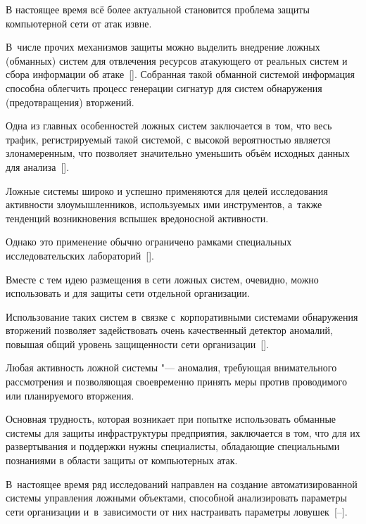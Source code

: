
В настоящее время всё более актуальной становится проблема защиты компьютерной сети от атак извне. 

В~числе прочих механизмов защиты можно выделить внедрение ложных (обманных) систем для отвлечения ресурсов атакующего от реальных систем и сбора информации об атаке~[]. Собранная такой обманной системой информация способна облегчить процесс генерации сигнатур для систем обнаружения (предотвращения) вторжений. 

Одна из главных особенностей ложных систем заключается в~том, что весь трафик, регистрируемый такой системой, с высокой вероятностью является злонамеренным, что позволяет значительно уменьшить объём исходных данных для анализа~[]. 

Ложные системы широко и успешно применяются для целей исследования активности злоумышленников, используемых ими инструментов, а~также тенденций возникновения вспышек вредоносной активности. 

Однако это применение обычно ограничено рамками специальных исследовательских лабораторий~[]. 

Вместе с тем идею размещения в сети ложных систем, очевидно, можно использовать и для защиты сети отдельной организации. 

Использование таких систем в~связке с~корпоративными системами обнаружения вторжений позволяет задействовать очень качественный детектор аномалий, повышая общий уровень защищенности сети организации~[]. 

Любая активность ложной системы "--- аномалия, требующая внимательного рассмотрения и позволяющая своевременно принять меры против проводимого или планируемого вторжения. 



Основная трудность, которая возникает при попытке использовать обманные системы для защиты инфраструктуры предприятия, заключается в том, что для их развертывания и поддержки нужны специалисты, обладающие специальными познаниями в области защиты от компьютерных атак. 

В~настоящее время ряд исследований направлен на создание автоматизированной системы управления ложными объектами, способной анализировать параметры сети организации и~в~зависимости от них настраивать параметры ловушек~[--]. 

